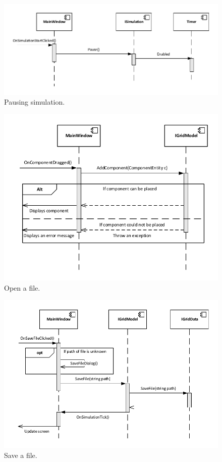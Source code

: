 \begin{figure}[!ht]
	\centering
	\includegraphics{figures/Pausing}
	\caption{Pausing simulation.}
\end{figure}

\begin{figure}[!ht]
	\centering
	\includegraphics{figures/LoadFile}
	\caption{Open a file.}
\end{figure}

\begin{figure}[!ht]
	\centering
	\includegraphics{figures/SaveFile}
	\caption{Save a file.}
\end{figure}

